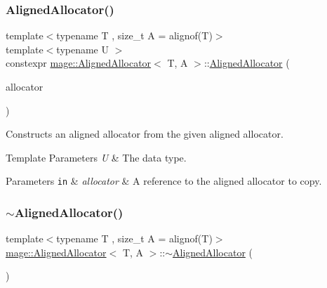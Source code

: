 \subsubsection{\texorpdfstring{Aligned\+Allocator()}{AlignedAllocator()}\hspace{0.1cm}{\footnotesize\ttfamily [4/4]}}
{\footnotesize\ttfamily template$<$typename T , size\+\_\+t A = alignof(\+T)$>$ \\
template$<$typename U $>$ \\
constexpr \mbox{\hyperlink{classmage_1_1_aligned_allocator}{mage\+::\+Aligned\+Allocator}}$<$ T, A $>$\+::\mbox{\hyperlink{classmage_1_1_aligned_allocator}{Aligned\+Allocator}} (\begin{DoxyParamCaption}\item[{\mbox{[}\mbox{[}maybe\+\_\+unused\mbox{]} \mbox{]} const \mbox{\hyperlink{classmage_1_1_aligned_allocator}{Aligned\+Allocator}}$<$ U, A $>$ \&}]{allocator }\end{DoxyParamCaption})\hspace{0.3cm}{\ttfamily [noexcept]}}

Constructs an aligned allocator from the given aligned allocator.


\begin{DoxyTemplParams}{Template Parameters}
{\em U} & The data type. \\
\hline
\end{DoxyTemplParams}

\begin{DoxyParams}[1]{Parameters}
\mbox{\tt in}  & {\em allocator} & A reference to the aligned allocator to copy. \\
\hline
\end{DoxyParams}
\mbox{\label{classmage_1_1_aligned_allocator_aafac29097c8439629bc814d1f5bd0d24}} 
\subsubsection{\texorpdfstring{$\sim$\+Aligned\+Allocator()}{~AlignedAllocator()}}
{\footnotesize\ttfamily template$<$typename T , size\+\_\+t A = alignof(\+T)$>$ \\
\mbox{\hyperlink{classmage_1_1_aligned_allocator}{mage\+::\+Aligned\+Allocator}}$<$ T, A $>$\+::$\sim$\mbox{\hyperlink{classmage_1_1_aligned_allocator}{Aligned\+Allocator}} (\begin{DoxyParamCaption}{ }\end{DoxyParamCaption})\hspace{0.3cm}{\ttfamily [default]}}

